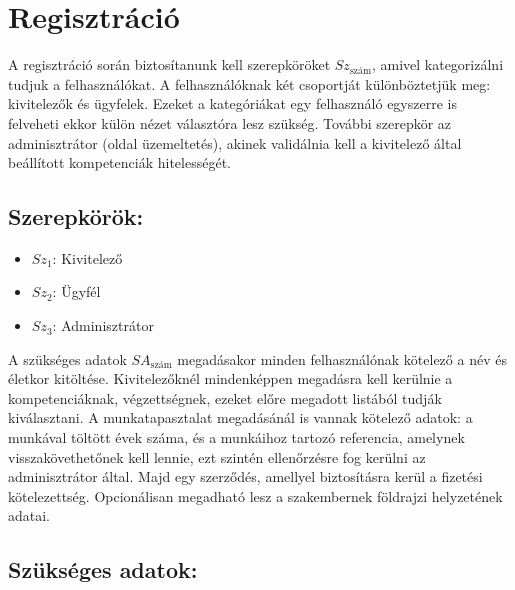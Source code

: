 \section{Regisztráció}


A regisztráció során biztosítanunk kell szerepköröket $Sz_{\text{szám}}$, amivel kategorizálni tudjuk a felhasználókat. A felhasználóknak két csoportját különböztetjük meg: kivitelezők és ügyfelek. Ezeket a kategóriákat egy felhasználó egyszerre is felveheti ekkor külön nézet választóra lesz szükség. További szerepkör az adminisztrátor (oldal üzemeltetés), akinek validálnia kell a kivitelező által beállított kompetenciák hitelességét.

\subsection{Szerepkörök:}

\begin{itemize}
    \item $Sz_1$: Kivitelező
    \item $Sz_2$: Ügyfél
    \item $Sz_3$: Adminisztrátor
\end{itemize}

A szükséges adatok $SA_{\text{szám}}$ megadásakor minden felhasználónak kötelező a név és életkor kitöltése. Kivitelezőknél mindenképpen megadásra kell kerülnie a kompetenciáknak, végzettségnek, ezeket előre megadott listából tudják kiválasztani. A munkatapasztalat megadásánál is vannak kötelező adatok: a munkával töltött évek száma, és a munkáihoz tartozó referencia, amelynek visszakövethetőnek kell lennie, ezt szintén ellenőrzésre fog kerülni az adminisztrátor által. Majd egy szerződés, amellyel biztosításra kerül a fizetési kötelezettség. Opcionálisan megadható lesz a szakembernek földrajzi helyzetének adatai.

\subsection{Szükséges adatok:}

